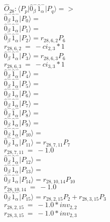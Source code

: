 \documentclass[14pt]{article}
\begin{document}
    $\hat{O}_{28}:  \langle{P_p}\vert \hat{0}_{\beta}^{-}\hat{1}_{\alpha}^{-} \vert{P_q}\rangle => $ \\ 
    $ \hat{0}_{\beta}^{-}\hat{1}_{\alpha}^{-} \vert{P_{0}}\rangle =  $ \\ 
    $ \hat{0}_{\beta}^{-}\hat{1}_{\alpha}^{-} \vert{P_{1}}\rangle =  $ \\ 
    $ \hat{0}_{\beta}^{-}\hat{1}_{\alpha}^{-} \vert{P_{2}}\rangle = {r}_{28,6,2}P_{6} $ \\ 
    ${r}_{28,6,2}\ =\ -{ci}_{2,3}*1 $ \\ 
    $ \hat{0}_{\beta}^{-}\hat{1}_{\alpha}^{-} \vert{P_{3}}\rangle = {r}_{28,6,3}P_{6} $ \\ 
    ${r}_{28,6,3}\ =\ -{ci}_{3,3}*1 $ \\ 
    $ \hat{0}_{\beta}^{-}\hat{1}_{\alpha}^{-} \vert{P_{4}}\rangle =  $ \\ 
    $ \hat{0}_{\beta}^{-}\hat{1}_{\alpha}^{-} \vert{P_{5}}\rangle =  $ \\ 
    $ \hat{0}_{\beta}^{-}\hat{1}_{\alpha}^{-} \vert{P_{6}}\rangle =  $ \\ 
    $ \hat{0}_{\beta}^{-}\hat{1}_{\alpha}^{-} \vert{P_{7}}\rangle =  $ \\ 
    $ \hat{0}_{\beta}^{-}\hat{1}_{\alpha}^{-} \vert{P_{8}}\rangle =  $ \\ 
    $ \hat{0}_{\beta}^{-}\hat{1}_{\alpha}^{-} \vert{P_{9}}\rangle =  $ \\ 
    $ \hat{0}_{\beta}^{-}\hat{1}_{\alpha}^{-} \vert{P_{10}}\rangle =  $ \\ 
    $ \hat{0}_{\beta}^{-}\hat{1}_{\alpha}^{-} \vert{P_{11}}\rangle = {r}_{28,7,11}P_{7} $ \\ 
    ${r}_{28,7,11}\ =\ -1.0 $ \\ 
    $ \hat{0}_{\beta}^{-}\hat{1}_{\alpha}^{-} \vert{P_{12}}\rangle =  $ \\ 
    $ \hat{0}_{\beta}^{-}\hat{1}_{\alpha}^{-} \vert{P_{13}}\rangle =  $ \\ 
    $ \hat{0}_{\beta}^{-}\hat{1}_{\alpha}^{-} \vert{P_{14}}\rangle = {r}_{28,10,14}P_{10} $ \\ 
    ${r}_{28,10,14}\ =\ -1.0 $ \\ 
    $ \hat{0}_{\beta}^{-}\hat{1}_{\alpha}^{-} \vert{P_{15}}\rangle = {r}_{28,2,15}P_{2}+{r}_{28,3,15}P_{3} $ \\ 
    ${r}_{28,2,15}\ =\ -1.0*{inv}_{2,2} $ \\ 
    ${r}_{28,3,15}\ =\ -1.0*{inv}_{2,3} $ \\ 
    
\end{document}
